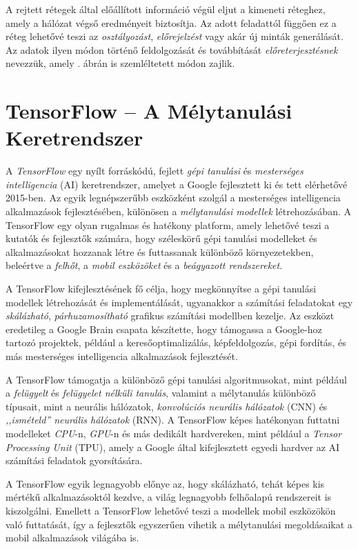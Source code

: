 \documentclass[
]{thesis-ekf}
\theoremstyle{definition}
\theoremstyle{remark}
\begin{document}
A rejtett rétegek által előállított információ végül eljut a kimeneti réteghez, amely a hálózat végső eredményeit biztosítja. Az adott feladattól függően ez a réteg lehetővé teszi az \emph{osztályozást}, \emph{előrejelzést} vagy akár új minták generálását. Az adatok ilyen módon történő feldolgozását és továbbítását \emph{előreterjesztésnek} nevezzük, amely . ábrán is szemléltetett módon zajlik. \cite{neuralNetwork}

\section{TensorFlow – A Mélytanulási Keretrendszer}
A \emph{TensorFlow} egy nyílt forráskódú, fejlett \emph{gépi tanulási} és \emph{mesterséges intelligencia} (AI) keretrendszer, amelyet a Google fejlesztett ki és tett elérhetővé 2015-ben. Az egyik legnépszerűbb eszközként szolgál a mesterséges intelligencia alkalmazások fejlesztésében, különösen a \emph{mélytanulási modellek} létrehozásában. A TensorFlow egy olyan rugalmas és hatékony platform, amely lehetővé teszi a kutatók és fejlesztők számára, hogy széleskörű gépi tanulási modelleket és alkalmazásokat hozzanak létre és futtassanak különböző környezetekben, beleértve a \emph{felhőt}, a \emph{mobil eszközöket} és a \emph{beágyazott rendszereket}. \cite{tensorflowDocs}

A TensorFlow kifejlesztésének fő célja, hogy megkönnyítse a gépi tanulási modellek létrehozását és implementálását, ugyanakkor a számítási feladatokat egy \emph{skálázható}, \emph{párhuzamosítható} grafikus számítási modellben kezelje. Az eszközt eredetileg a Google Brain csapata készítette, hogy támogassa a Google-hoz tartozó projektek, például a keresőoptimalizálás, képfeldolgozás, gépi fordítás, és más mesterséges intelligencia alkalmazások fejlesztését. \cite{tensorflowDocs}

A TensorFlow támogatja a különböző gépi tanulási algoritmusokat, mint például a \emph{felügyelt} és \emph{felügyelet nélküli tanulás}, valamint a mélytanulás különböző típusait, mint a neurális hálózatok, \emph{konvolúciós neurális hálózatok} (CNN) és \emph{,,ismételd'' neurális hálózatok} (RNN). A TensorFlow képes hatékonyan futtatni modelleket \emph{CPU}-n, \emph{GPU}-n és más dedikált hardvereken, mint például a \emph{Tensor Processing Unit} (TPU), amely a Google által kifejlesztett egyedi hardver az AI számítási feladatok gyorsítására. \cite{tensorflowDocs}

A TensorFlow egyik legnagyobb előnye az, hogy skálázható, tehát képes kis mértékű alkalmazásoktól kezdve, a világ legnagyobb felhőalapú rendszereit is kiszolgálni. Emellett a TensorFlow lehetővé teszi a modellek mobil eszközökön való futtatását, így a fejlesztők egyszerűen vihetik a mélytanulási megoldásaikat a mobil alkalmazások világába is. \cite{tensorflowDocs}
\end{document}
